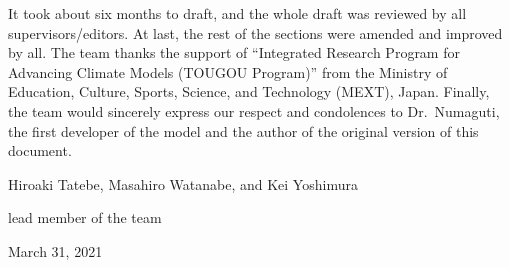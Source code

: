 It took about six months to draft, and the whole draft was reviewed by all supervisors/editors. At last, the rest of the sections were amended and improved by all. The team thanks the support of
``Integrated Research Program for Advancing Climate Models (TOUGOU Program)'' from the Ministry of Education, Culture, Sports, Science, and Technology (MEXT), Japan. Finally, the team would sincerely
express our respect and condolences to Dr.~Numaguti, the first developer of the model and the author of the original version of this document.

\begin{flushright}

Hiroaki Tatebe, Masahiro Watanabe, and Kei Yoshimura

lead member of the team

March 31, 2021

\end{flushright}
